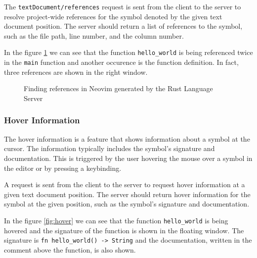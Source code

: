 The \texttt{textDocument/references} request is sent from the client to the server to resolve project-wide references for the symbol denoted by the given text document position. The server should return a list of references to the symbol, such as the file path, line number, and the column number.

In the figure \ref{fig:references} we can see that the function \texttt{hello\_world} is being referenced twice in the \texttt{main} function and another occurence is the function definition. In fact, three references are shown in the right window.

\begin{figure}[t]
    \centering
    \caption{Finding references in Neovim generated by the Rust Language Server}
    \label{fig:references}
\end{figure}

\subsubsection{Hover Information}

\hfill \break

The hover information is a feature that shows information about a symbol at the cursor. The information typically includes the symbol's signature and documentation. This is triggered by the user hovering the mouse over a symbol in the editor or by pressing a keybinding.

A request is sent from the client to the server to request hover information at a given text document position. The server should return hover information for the symbol at the given position, such as the symbol's signature and documentation.

In the figure \ref{fig:hover} we can see that the function \texttt{hello\_world} is being hovered and the signature of the function is shown in the floating window. The signature is \texttt{fn hello\_world() -> String} and the documentation, written in the comment above the function, is also shown.

